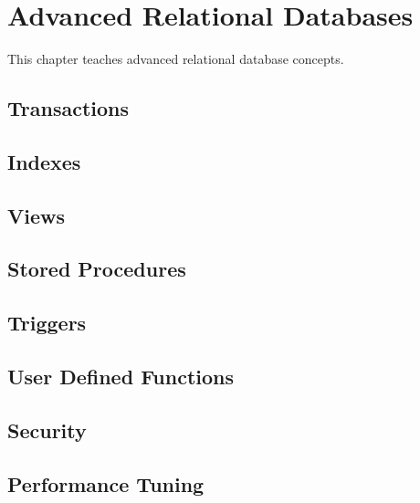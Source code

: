 \chapter{Advanced Relational Databases}
\label{chap:relational:advanced-relational-databases}
This chapter teaches advanced relational database concepts.

\section{Transactions}
\section{Indexes}
\section{Views}
\section{Stored Procedures}
\section{Triggers}
\section{User Defined Functions}
\section{Security}
\section{Performance Tuning}


